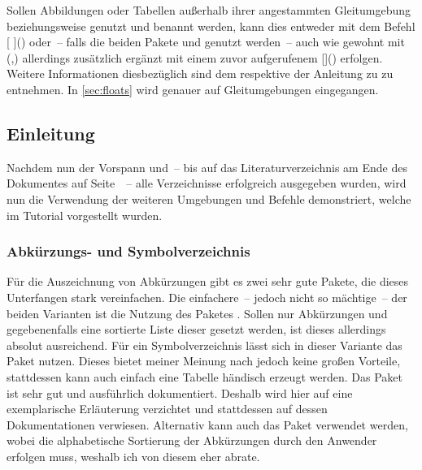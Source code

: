 \documentclass[%
  english,ngerman,%
  cdgeometry=no,DIV=12,%
  cd=false,cdfont=false,cdtitle=true,%
  headings=normal,%
  automark,%
  listof=toc,%
]{tudscrartcl}
\begin{document}
Sollen Abbildungen oder Tabellen außerhalb ihrer angestammten Gleitumgebung 
 beziehungsweise  genutzt und benannt 
werden, kann dies entweder mit dem Befehl 
[%
]() oder~-- falls die beiden Pakete  und 
 genutzt werden~-- auch wie gewohnt mit 
(,) allerdings zusätzlich 
ergänzt mit einem zuvor aufgerufenem
[]()  
erfolgen. Weitere Informationen diesbezüglich sind dem \scrguide respektive der 
Anleitung zu  zu entnehmen. In \autoref{sec:floats} wird 
genauer auf Gleitumgebungen eingegangen.
%
\begin{Trunk}
\tableofcontents
\listoffigures
\listoftables

\end{Trunk}
\begin{Trunk+}
\printacronyms[style=acrotabu]
\printsymbols[style=symblongtabu]

\chapter{Einleitung}
Nachdem nun der Vorspann und~-- bis auf das Literaturverzeichnis am 
Ende des Dokumentes auf Seite~\pageref{sec:bibliography}~-- alle 
Verzeichnisse erfolgreich ausgegeben wurden, wird nun die Verwendung 
der weiteren Umgebungen und Befehle demonstriert, welche im Tutorial 
 vorgestellt wurden.

\end{Trunk+}


\subsection{Abkürzungs- und Symbolverzeichnis}
\label{sec:glossaries}%
%
Für die Auszeichnung von Abkürzungen gibt es zwei sehr gute Pakete, die dieses 
Unterfangen stark vereinfachen. Die einfachere~-- jedoch nicht so mächtige~-- 
der beiden Varianten ist die Nutzung des Paketes . Sollen nur 
Abkürzungen und gegebenenfalls eine sortierte Liste dieser gesetzt werden, ist 
dieses allerdings absolut ausreichend. Für ein Symbolverzeichnis lässt sich in 
dieser Variante das Paket  nutzen. Dieses bietet meiner 
Meinung nach jedoch keine großen Vorteile, stattdessen kann auch einfach eine 
Tabelle händisch erzeugt werden. Das Paket  ist sehr gut und 
ausführlich dokumentiert. Deshalb wird hier auf eine exemplarische Erläuterung 
verzichtet und stattdessen auf dessen Dokumentationen verwiesen. Alternativ 
kann auch das Paket  verwendet werden, wobei die alphabetische 
Sortierung der Abkürzungen durch den Anwender erfolgen muss, weshalb ich von 
diesem eher abrate.
\end{document}
